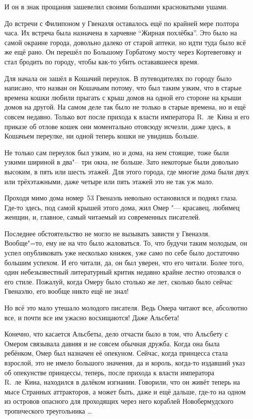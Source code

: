 И он в знак прощания зашевелил своими большими красноватыми ушами.

До встречи с Филипоном у Гвенаэля оставалось ещё по крайней мере полтора часа.
Их встреча была назначена в харчевне \enquote{Жирная похлёбка}.
Это было на самой окраине города, довольно далеко от старой аптеки, но идти туда
было всё же ещё рано.
Он перешёл по Большому Горбатому мосту через Кортевеговку и стал бродить по
городу, чтобы как-то убить остававшееся время.

Для начала он зашёл в Кошачий переулок.
В путеводителях по городу было написано, что назван он Кошачьим потому, что был
таким узким, что в старые времена кошки любили прыгать с крыш домов на одной его
стороне на крыши домов на другой.
На самом деле так было не только в старые времена, но и ещё совсем недавно.
Только вот после прихода к власти императора R.~ле~Кина и его приказе об отлове
кошек они моментально отовсюду исчезли, даже здесь, в Кошачьем переулке, ни
одной теперь кошки не увидишь больше.

Не только сам переулок был узким, но и дома, на нем стоящие, тоже были узкими
шириной в два"--~три окна, не больше.
Зато некоторые были довольно высоким, в пять или шесть этажей.
Для этого города, где многие дома были двух или трёхэтажными, даже четыре или
пять этажей это не так уж мало.

Проходя мимо дома номер~53 Гвенаэль невольно остановился и поднял глаза.
Где-то здесь, под самой крышей этого дома, жил Омер "--- красавец, любимец
женщин, и, главное, самый читаемый из современных писателей.

Последнее обстоятельство не могло не вызывать зависти у Гвенаэля.
Вообще"=то, ему не на что было жаловаться.
То, что будучи таким молодым, он успел опубликовать уже несколько книжек, уже
само по себе было достаточно большим успехом.
И его читали, да, он был уверен, что его читали.
Более того, один небезызвестный литературный критик недавно крайне лестно
отозвался о его стиле.
Пожалуй, когда Омеру было столько же лет, сколько было сейчас Гвенаэлю, его
вообще никто ещё не знал!

Но всё это мало утешало молодого писателя.
Ведь Омера читают все, абсолютно все, и почти все им ужасно восхищаются!
Даже Альсбета!

Конечно, что касается Альсбеты, дело отчасти было в том, что Альсбету с Омером
связывала давняя и не совсем обычная дружба.
Когда она была ребёнком, Омер был назначен её опекуном.
Сейчас, когда принцесса стала взрослой, это не имело большого значения, да и
король, когда-то издавший указ об опекунстве принцессы, теперь, после прихода к
власти императора R.~ле~Кина, находился в далёком изгнании.
Говорили, что он живёт теперь на мысе Странных аттракторов, а может быть, даже и
ещё дальше, где-то на одном из островов опасного для проходящих через него
кораблей Новобермудского тропического треугольника \ldots

